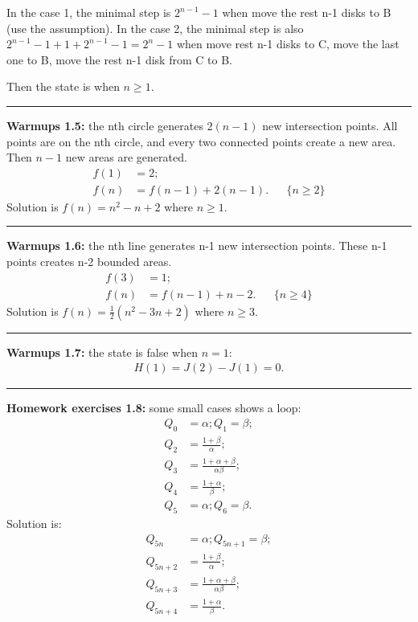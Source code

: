 \documentclass{article}
\begin{document}
In the case 1, the minimal step is $2^{n-1}-1$ when move the rest n-1 disks to B (use the assumption).
In the case 2, the minimal step is also $2^{n-1}-1+1+2^{n-1}-1 = 2^n-1$ when move rest n-1 disks to C, move the last one to B, move the rest n-1 disk from C to B.


Then the state is when $n \ge 1$.

\noindent\rule{\textwidth}{0.4pt}
\textbf{Warmups 1.5:}
the nth circle generates $2(n-1)$ new intersection points.
All points are on the nth circle, and every two connected points create a new area.
Then $n-1$ new areas are generated.
\begin{align}
f(1) & =2;\\
f(n) & =f(n-1)+2(n-1). && \{n\ge 2\}
\end{align}
Solution is $f(n) = n^2-n+2$ where $n \ge 1$.

\noindent\rule{\textwidth}{0.4pt}
\textbf{Warmups 1.6:}
the nth line generates n-1 new intersection points.
These n-1 points creates n-2 bounded areas.
\begin{align}
f(3) &= 1;\\
f(n) &= f(n-1) + n-2. && \{n\ge4\}
\end{align}
Solution is $f(n) = \frac{1}{2}(n^2-3n+2)$ where $n\ge 3$. 

\noindent\rule{\textwidth}{0.4pt}
\textbf{Warmups 1.7:}
the state is false when $n = 1$:
\begin{align}
H(1) = J(2) - J(1) = 0.
\end{align}

\noindent\rule{\textwidth}{0.4pt}
\textbf{Homework exercises 1.8:}
some small cases shows a loop:
\begin{align}
Q_0 &= \alpha;
Q_1 = \beta;\\
Q_2 &= \frac{1+\beta}{\alpha};\\
Q_3 &= \frac{1+\alpha+\beta}{\alpha \beta};\\
Q_4 &= \frac{1+\alpha}{\beta};\\
Q_5 &= \alpha;
Q_6 = \beta.
\end{align}
Solution is:
\begin{align}
Q_{5n} & = \alpha;
Q_{5n+1} = \beta;\\
Q_{5n+2} &= \frac{1+\beta}{\alpha};\\
Q_{5n+3} &= \frac{1+\alpha+\beta}{\alpha \beta};\\
Q_{5n+4} &= \frac{1+\alpha}{\beta}.
\end{align}
\end{document}
